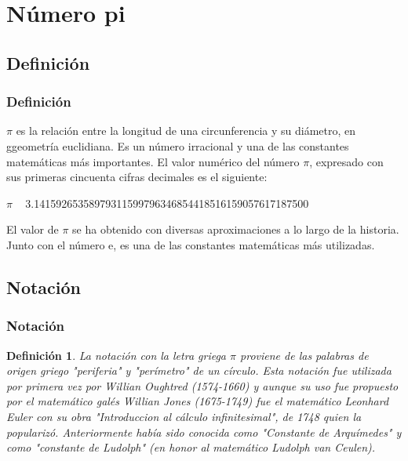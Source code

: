 \documentclass{beamer}
\newtheorem{definicion}{Definición}
\begin{document}
\section{Número pi}

\subsection{Definición}
\begin{frame}
\frametitle{Definición}
$\pi$ es la relación entre la longitud de una circunferencia y su diámetro, en ggeometría euclidiana. Es un número irracional y una de las constantes matemáticas más importantes. 
El valor numérico del número $\pi$, expresado con sus primeras cincuenta cifras decimales es el siguiente: 
\begin{center}
$\pi$ ~ 3.14159265358979311599796346854418516159057617187500
\end{center}

El valor de $\pi$ se ha obtenido con diversas aproximaciones a lo largo de la historia. Junto con el número e, es una de las constantes matemáticas más utilizadas.

\end{frame}

\subsection{Notación}

\begin{frame}
\frametitle{Notación}

\begin{definicion}
  La notación con la letra griega $\pi$ proviene de las palabras de origen griego "periferia" y "perímetro" de un círculo.
Esta notación fue utilizada por primera vez por Willian Oughtred (1574-1660) y aunque su uso fue propuesto por el matemático galés Willian Jones (1675-1749) fue el matemático Leonhard Euler con su obra "Introduccion al cálculo infinitesimal", de 1748 quien la popularizó. 
Anteriormente había sido conocida como "Constante de Arquímedes" y como "constante de Ludolph" (en honor al matemático Ludolph van Ceulen).\cite{URL:HTTP}
\end{definicion}
\end{frame}
\end{document}
